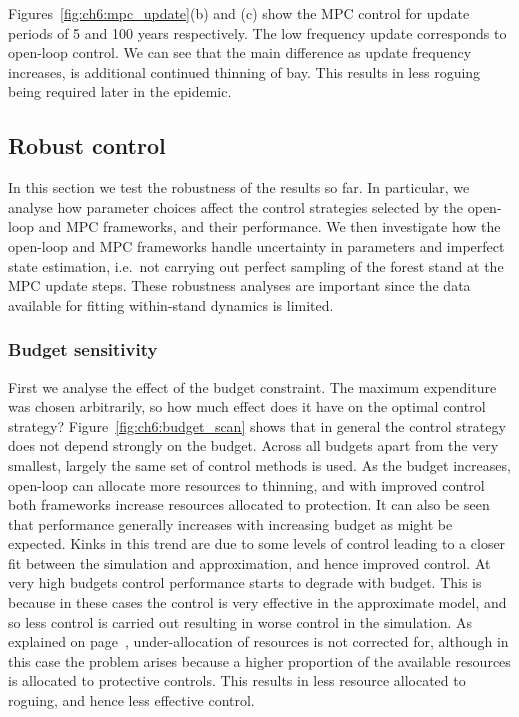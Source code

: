 Figures~\ref{fig:ch6:mpc_update}(b) and (c) show the MPC control for update periods of 5 and 100 years respectively. The low frequency update corresponds to open-loop control. We can see that the main difference as update frequency increases, is additional continued thinning of bay. This results in less roguing being required later in the epidemic.

\FloatBarrier
\subsection{Robust control}\label{sec:ch6:robust}

In this section we test the robustness of the results so far. In particular, we analyse how parameter choices affect the control strategies selected by the open-loop and MPC frameworks, and their performance. We then investigate how the open-loop and MPC frameworks handle uncertainty in parameters and imperfect state estimation, i.e.\ not carrying out perfect sampling of the forest stand at the MPC update steps. These robustness analyses are important since the data available for fitting within-stand dynamics is limited.

\subsubsection{Budget sensitivity}

First we analyse the effect of the budget constraint. The maximum expenditure was chosen arbitrarily, so how much effect does it have on the optimal control strategy? Figure~\ref{fig:ch6:budget_scan} shows that in general the control strategy does not depend strongly on the budget. Across all budgets apart from the very smallest, largely the same set of control methods is used. As the budget increases, open-loop can allocate more resources to thinning, and with improved control both frameworks increase resources allocated to protection. It can also be seen that performance generally increases with increasing budget as might be expected. Kinks in this trend are due to some levels of control leading to a closer fit between the simulation and approximation, and hence improved control. At very high budgets control performance starts to degrade with budget. This is because in these cases the control is very effective in the approximate model, and so less control is carried out resulting in worse control in the simulation. As explained on page~\pageref{sec:ch6:lifting}, under-allocation of resources is not corrected for, although in this case the problem arises because a higher proportion of the available resources is allocated to protective controls. This results in less resource allocated to roguing, and hence less effective control.


